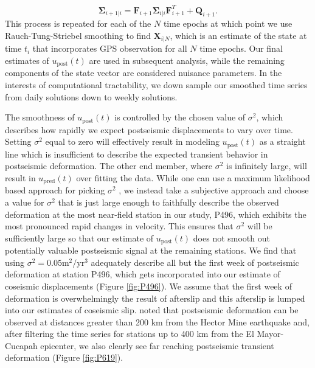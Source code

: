 \documentclass[draft,linenumbers]{AGUJournal}
\begin{document}
\begin{equation}
  \mathbf{\Sigma}_{i+1|i} = \mathbf{F}_{i+1}\mathbf{\Sigma}_{i|i}\mathbf{F}^T_{i+1} + \mathbf{Q}_{i+1}.
\end{equation}
This process is repeated for each of the $N$ time epochs at which point we use Rauch-Tung-Striebel smoothing \citep{Rauch1965} to find $\mathbf{X}_{i|N}$, which is an estimate of the state at time $t_i$ that incorporates GPS observation for all $N$ time epochs.  Our final estimates of $u_\mathrm{post}(t)$ are used in subsequent analysis, while the remaining components of the state vector are considered nuisance parameters. In the interests of computational tractability, we down sample our smoothed time series from daily solutions down to weekly solutions.

The smoothness of $u_\mathrm{post}(t)$ is controlled by the chosen value of $\sigma^2$, which describes how rapidly we expect postseismic displacements to vary over time.  Setting $\sigma^2$ equal to zero will effectively result in modeling $u_\mathrm{post}(t)$ as a straight line which is insufficient to describe the expected transient behavior in postseismic deformation. The other end member, where $\sigma^2$ is infinitely large, will result in $u_\mathrm{pred}(t)$ over fitting the data. While one can use a maximum likelihood based approach for picking $\sigma^2$ \citep[e.g.][]{Segall1997}, we instead take a subjective approach and choose a value for $\sigma^2$ that is just large enough to faithfully describe the observed deformation at the most near-field station in our study, P496, which exhibits the most pronounced rapid changes in velocity. This ensures that $\sigma^2$ will be sufficiently large so that our estimate of $u_\mathrm{post}(t)$ does not smooth out potentially valuable postseismic signal at the remaining stations. We find that using $\sigma^2 = 0.05 \mathrm{m}^2 / \mathrm{yr}^3$ adequately describe all but the first week of postseismic deformation at station P496, which gets incorporated into our estimate of coseismic displacements (Figure \ref{fig:P496}).  We assume that the first week of deformation is overwhelmingly the result of afterslip and this afterslip is lumped into our estimates of coseismic slip. \citet{Freed2007a} noted that postseismic deformation can be observed at distances greater than 200 km from the Hector Mine earthquake and, after filtering the time series for stations up to 400 km from the El Mayor-Cucapah epicenter, we also clearly see far reaching postseismic transient deformation (Figure \ref{fig:P619}).      
\end{document}
